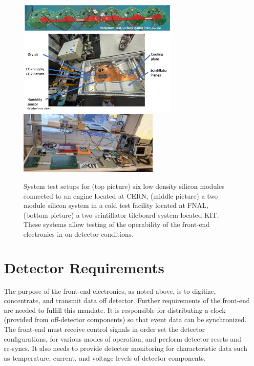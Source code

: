 \documentclass[twocolumn]{webofc}
\begin{document}
\begin{figure}[ht]
\centering
\includegraphics[width=8cm,clip]{figures/SixModules.png}
\includegraphics[width=8cm,clip]{figures/CoolingPlate.png}
\includegraphics[width=7cm,clip]{figures/Scint.png}
    \caption{System test setups for (top picture) six low density silicon modules connected to an engine located at CERN, (middle picture) a two module silicon system in a cold test facility located at FNAL, (bottom picture) a two scintillator tileboard system located KIT. These systems allow testing of the operability of the front-end electronics in on detector conditions.}
\label{fig:systems}
\vspace*{-0.5cm}
\end{figure}


\section{Detector Requirements}
\label{sec:det_req}

The purpose of the front-end electronics, as noted above, is to digitize, concentrate, and transmit data off detector. Further requirements of the front-end are needed to fulfill this mandate. It is responsible for distributing a clock (provided from off-detector components) so that event data can be synchronized. The front-end must receive control signals in order set the detector configurations, for various modes of operation, and perform detector resets and re-syncs. It also needs to provide detector monitoring for characteristic data such as temperature, current, and voltage levels of detector components.
\end{document}
